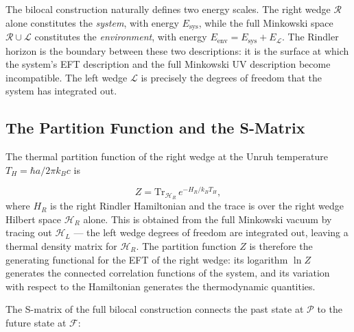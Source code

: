 \documentclass[12pt,a4paper]{article}
\begin{document}
The bilocal construction naturally defines two energy 
scales. The right wedge $\mathcal{R}$ alone constitutes 
the \emph{system}, with energy $E_{\text{sys}}$, while 
the full Minkowski space $\mathcal{R} \cup \mathcal{L}$ 
constitutes the \emph{environment}, with energy 
$E_{\text{env}} = E_{\text{sys}} + E_{\mathcal{L}}$. 
The Rindler horizon is the boundary between these two 
descriptions: it is the surface at which the system's 
EFT description and the full Minkowski UV description 
become incompatible. The left wedge $\mathcal{L}$ is 
precisely the degrees of freedom that the system has 
integrated out.


\subsection{The Partition Function and the S-Matrix}

The thermal partition function of the right wedge at 
the Unruh temperature $T_H = \hbar a/2\pi k_Bc$ is

\begin{equation}
Z = \mathrm{Tr}_{\mathcal{H}_R}\, e^{-H_R/k_BT_H},
\end{equation}
where $H_R$ is the right Rindler Hamiltonian and the 
trace is over the right wedge Hilbert space $\mathcal{H}_R$ 
alone. This is obtained from the full Minkowski vacuum by 
tracing out $\mathcal{H}_L$ --- the left wedge degrees of 
freedom are integrated out, leaving a thermal density 
matrix for $\mathcal{H}_R$. The partition function $Z$ 
is therefore the generating functional for the EFT of 
the right wedge: its logarithm $\ln Z$ generates the 
connected correlation functions of the system, and its 
variation with respect to the Hamiltonian generates the 
thermodynamic quantities.

The S-matrix of the full bilocal construction connects 
the past state at $\mathcal{P}$ to the future state at 
$\mathcal{F}$:
\end{document}
